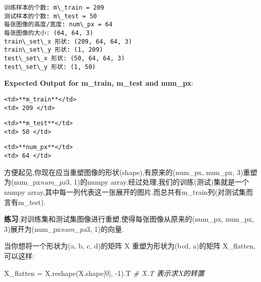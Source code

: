 \documentclass[11pt]{article}
\newenvironment{Shaded}{}{}
\newcommand{\DecValTok}[1]{\textcolor[rgb]{0.25,0.63,0.44}{{#1}}}
\newcommand{\CommentTok}[1]{\textcolor[rgb]{0.38,0.63,0.69}{\textit{{#1}}}}
\newcommand{\NormalTok}[1]{{#1}}
\newcommand{\OperatorTok}[1]{\textcolor[rgb]{0.40,0.40,0.40}{{#1}}}
\begin{document}
    \begin{Verbatim}[commandchars=\\\{\}]
训练样本的个数: m\_train = 209
测试样本的个数: m\_test = 50
每张图像的高度/宽度: num\_px = 64
每张图像的大小: (64, 64, 3)
train\_set\_x 形状: (209, 64, 64, 3)
train\_set\_y 形状: (1, 209)
test\_set\_x 形状: (50, 64, 64, 3)
test\_set\_y 形状: (1, 50)

    \end{Verbatim}

    \textbf{Expected Output for m\_train, m\_test and num\_px}:

\begin{verbatim}
<td>**m_train**</td>
<td> 209 </td> 
\end{verbatim}

\begin{verbatim}
<td>**m_test**</td>
<td> 50 </td> 
\end{verbatim}

\begin{verbatim}
<td>**num_px**</td>
<td> 64 </td> 
\end{verbatim}

    方便起见,你现在应当重塑图像的形状(shape),有原来的(num\_px, num\_px,
3)重塑为(num\_px\emph{num\_px}3, 1)的numpy
array.经过处理,我们的训练(测试)集就是一个numpy
array,其中每一列代表这一张展开的图片.而总共有m\_train列(对测试集而言有m\_test).

\textbf{练习}:对训练集和测试集图像进行重塑,使得每张图像从原来的(num\_px,
num\_px, 3)展开为(num\_px\emph{num\_px}3, 1)的向量.

当你想将一个形状为(a, b, c, d)的矩阵 X 重塑为形状为(b\emph{c}d, a)的矩阵
X\_flatten,可以这样:

\begin{Shaded}
\begin{Highlighting}[]
\NormalTok{    X_flatten }\OperatorTok{=}\NormalTok{ X.reshape(X.shape[}\DecValTok{0}\NormalTok{], }\OperatorTok{-}\DecValTok{1}\NormalTok{).T }\CommentTok{# X.T 表示求X的转置}
\end{Highlighting}
\end{Shaded}
\end{document}
